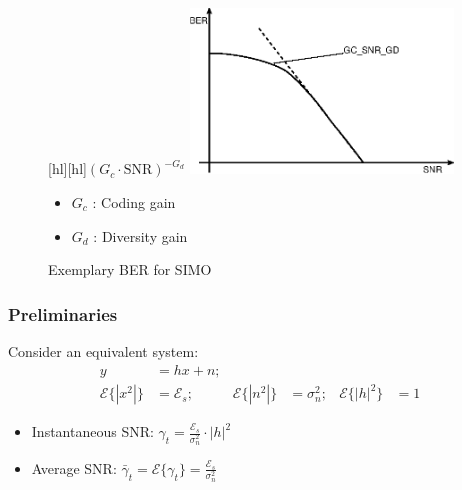 \documentclass[a4paper, 10pt]{article}
\begin{document}
\begin{figure}
\begin{minipage}[hbt]{7cm}
	
		\centering
		[hl][hl]{$(G_c\cdot\text{SNR})^{-G_d}$}
		\includegraphics[width=7cm]{SIMO_BER_SNR_Kurve}
		\caption{Exemplary BER for SIMO}
		\label{fig:SIMO_BER_SNR_Kurve}
	
\end{minipage}
\hfill
\begin{minipage}[hbt]{5cm}
	\centering
		\begin{itemize}
			\item $G_c$ : Coding gain
			\item $G_d$ : Diversity gain
		\end{itemize}
\end{minipage}
\end{figure}

\subsubsection{Preliminaries}
Consider an equivalent system:
\begin{align*}
	y &= hx +n;\\
	\mathcal{E}\{|x^2|\} &= \mathcal{E}_s; & \mathcal{E}\{|n^2|\} &= \sigma_n^2; & \mathcal{E}\{|h|^2\} &= 1
\end{align*}
\begin{itemize}
	\item Instantaneous SNR: $\gamma_t = \frac{\mathcal{E}_s}{\sigma_n^2}\cdot |h|^2$
\item Average SNR: $\bar{\gamma}_t = \mathcal{E}\{\gamma_t\} = \frac{\mathcal{E}_s}{\sigma_n^2}$
\end{itemize}
\end{document}
